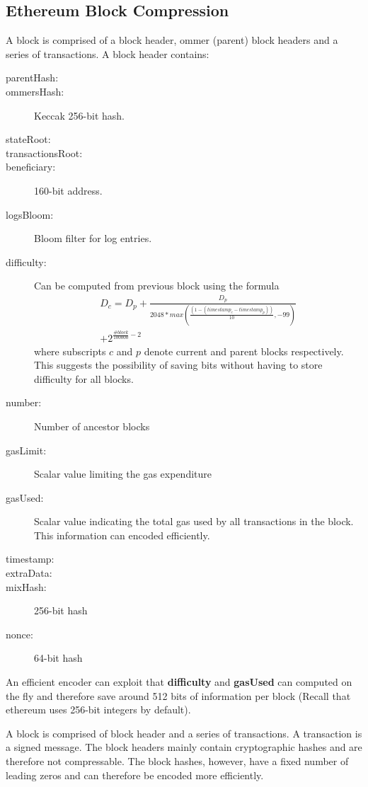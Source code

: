 \subsection{Ethereum Block Compression}\label{sec:blockcompress}

A block is comprised of a block header, ommer (parent) block headers and a series of transactions. 
A block header contains: 

\begin{description}
 \item[parentHash:] 
 \item[ommersHash:]  Keccak 256-bit hash.
 \item[stateRoot:]  
 \item[transactionsRoot:]
 \item[beneficiary:]160-bit address.
 \item[logsBloom:] Bloom filter for log entries.
 \item[difficulty:] Can be computed from previous block using the formula
	\begin{multline*}
	D_{c} = D_{p} + \frac{D_{p}}{2048 * max(\frac{(1 - (timestamp_{c} - timestamp_{p}))}{10}, -99)}\\ + 2^{\frac{\#block}{100000} - 2}
        \end{multline*}
	where subscripts $c$ and $p$ denote current and parent blocks respectively. 
 This suggests the possibility of saving bits without having to store difficulty for all blocks.
 \item[number:] Number of ancestor blocks
 \item[gasLimit:] Scalar value limiting the gas expenditure
 \item[gasUsed:] Scalar value indicating the total gas used by all transactions in the block. This information can encoded efficiently.
 \item[timestamp:]
 \item[extraData:]
 \item[mixHash:] 256-bit hash
 \item[nonce:] 64-bit hash
\end{description}

An efficient encoder can exploit that \textbf{difficulty} and \textbf{gasUsed} can computed on the fly and therefore save around 512 bits of information per block (Recall that ethereum uses 256-bit integers by default).  

A block is comprised of block header and a series of transactions. A transaction is a signed message. The block headers mainly
contain cryptographic hashes and are therefore not compressable. The block hashes, however, have a fixed number of leading zeros and
can therefore be encoded more efficiently.

